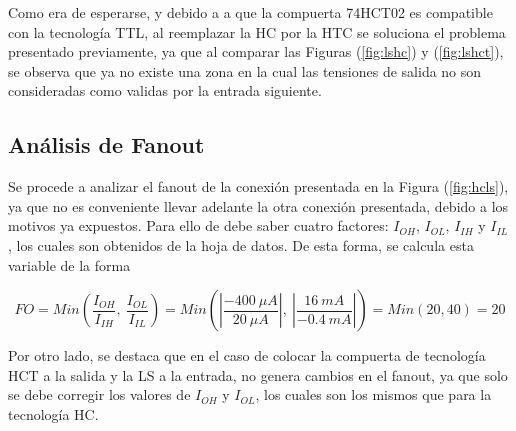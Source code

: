 Como era de esperarse, y debido a a que la compuerta 74HCT02 es compatible con la tecnología TTL, al reemplazar la HC por la HTC se soluciona el problema presentado previamente, ya que al comparar las Figuras (\ref{fig:lshc}) y (\ref{fig:lshct}), se observa que ya no existe una zona en la cual las tensiones de salida no son consideradas como validas por la entrada siguiente.

\subsection{Análisis de Fanout}

Se procede a analizar el fanout de la conexión presentada en la Figura (\ref{fig:hcls}), ya que no es conveniente llevar adelante la otra conexión presentada, debido a los motivos ya expuestos. Para ello de debe saber cuatro factores: $I_{OH}$, $I_{OL}$, $I_{IH}$ y $I_{IL}$, los cuales son obtenidos de la hoja de datos. De esta forma, se calcula esta variable de la forma

\begin{equation*}
	FO = Min \left( \frac{I_{OH}}{I_{IH}}, \ \frac{I_{OL}}{I_{IL}} \right) = Min \left( \left| \frac{-400 \ \mu A}{20 \ \mu A} \right|, \ \left| \frac{16 \ mA}{-0.4 \ mA}\right| \right) = Min \left( 20 , 40 \right) = 20
\end{equation*}

Por otro lado, se destaca que en el caso de colocar la compuerta de tecnología HCT a la salida y la LS a la entrada, no genera cambios en el fanout, ya que solo se debe corregir los valores de $I_{OH}$ y $I_{OL}$, los cuales son los mismos que para la tecnología HC.

